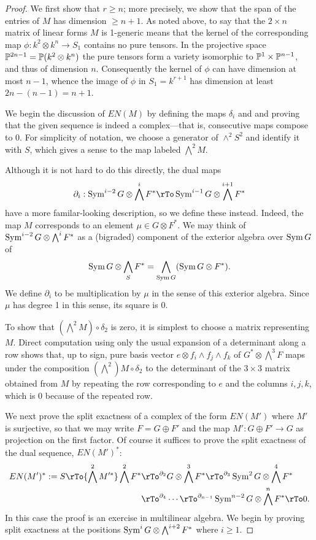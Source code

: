 \begin{proof} We first show that $r\geq n$; more precisely, we show that the span of the entries of $M$ has dimension $\geq n+1$. As noted above, to say that the $2\times n$ matrix of linear forms $M$ is 1-generic means that
the kernel of the corresponding map $ \phi: k^2\otimes k^n \to S_1$ contains no pure tensors. In the projective
space ${\mathbb P}^{2n-1} = {\mathbb P}(k^2\otimes k^n)$ the pure tensors form a variety isomorphic to ${\mathbb P}^1\times {\mathbb P}^{n-1}$, and thus of dimension $n$. Consequently the kernel of $\phi$ can have dimension at most $n-1$, whence the image of $\phi$ 
in $S_1 = k^{r+1}$ has dimension at least $2n-(n-1) = n+1$. 

We begin the discussion of $EN(M)$ by defining the maps $\delta_i$ and and proving that the given sequence is indeed a complex---that is, consecutive maps compose to 0. For simplicity of notation, we choose a generator of $\wedge^2 S^2$
 and identify it with $S$, which gives a sense to the map labeled $\bigwedge^2M$.
 
  Although it is not hard to do this directly, the dual maps
 $$
 \partial_i: \Sym^{i-2} G \otimes \bigwedge^i F^* \rTo \Sym^{i-1} G \otimes \bigwedge^{i+1} F^*
 $$
 have a more familar-looking description, so we define these instead. Indeed, the map $M$ corresponds to an
 element $\mu\in G\otimes F^*$. We may think of $ \operatorname{Sym}^{i-2} G \otimes \bigwedge^i  F^*$
 as a (bigraded) component of the exterior algebra over $ \operatorname{Sym} G$ of 
 $$
  \operatorname{Sym} G \otimes \bigwedge_S  F^*= \bigwedge_{ \operatorname{Sym} G} (\operatorname{Sym} G \otimes  F^*).
 $$
We define $\partial_i$ to be  multiplication by $\mu$ in the sense of this exterior algebra. Since $\mu$ has degree 1
in this sense, its square is 0. 

To show that $(\bigwedge^2 M)\circ \delta_2$ is zero, it is simplest to choose a matrix representing $M$.
Direct computation using only the usual expansion of a determinant
along a row shows that, up to sign,
pure basis vector $e\otimes f_i\wedge f_j\wedge f_k$ of $G^*\otimes \bigwedge^3 F$
maps under the composition $(\bigwedge^2) M\circ \delta_2$ to the determinant
of the $3\times 3$ matrix obtained from $M$ by repeating the row corresponding to $e$ and
the columns $i,j,k$, which is 0 because of the repeated row.

We next prove the split exactness of a complex of the form $EN(M')$ where $M'$ is surjective, so that we
may write $F = G\oplus F'$ and the map $M': G\oplus F' \to G$ as projection on the first factor. 
Of course
it suffices to prove the split exactness of the dual sequence, $EN(M')^*$:
\begin{align*}
EN(M')^* := 
S \rTo{\bigwedge^2 M'^*} 
 \bigwedge^2 F^*&
 \rTo^{\partial_{2}}
 G\otimes \bigwedge^3 F^*  
 \rTo^{\partial_{3}}
  \Sym^2G\otimes\bigwedge^4F^*  \\
 &\rTo^{\partial_{4}}\cdots\rTo^{\partial_{n-1}} 
\Sym^{n-2}G\otimes\bigwedge^nF^* 
 \rTo 0.
\end{align*}
In this case the proof
is an exercise in multilinear algebra. 
We begin by proving split exactness at the 
positions $\operatorname{Sym}^{i} G \otimes \bigwedge^{i+2}  F^*$ where $i\geq 1$.


\end{proof}
